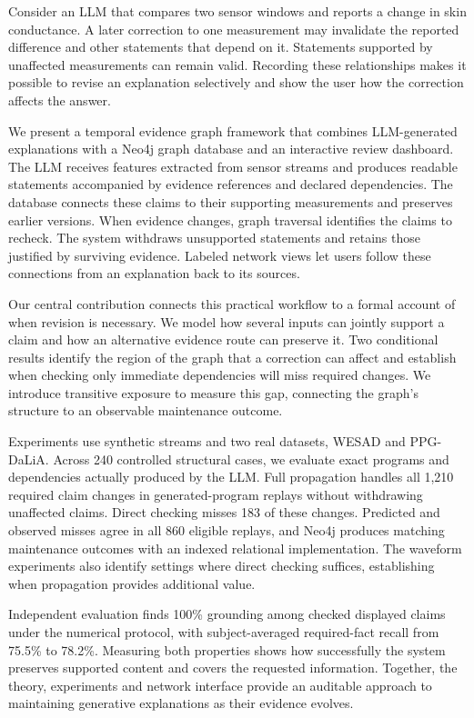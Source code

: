 \documentclass[runningheads]{llncs}
\newcommand{\SemCoreCases}{240}
\newcommand{\SemPredictionGroups}{860}
\newcommand{\SemSyntheticDisplayR}{78.2}
\newcommand{\SemPpgDisplayR}{75.5}
\begin{document}
Consider an LLM that compares two sensor windows and reports a change in skin
conductance. A later correction to one measurement may invalidate the reported
difference and other statements that depend on it. Statements supported by
unaffected measurements can remain valid. Recording these relationships makes
it possible to revise an explanation selectively and show the user how the
correction affects the answer.

We present a temporal evidence graph framework that combines LLM-generated
explanations with a Neo4j graph database and an interactive review dashboard.
The LLM receives features extracted from sensor streams and produces readable
statements accompanied by evidence references and declared dependencies.
The database connects these claims to their supporting measurements and
preserves earlier versions. When evidence changes, graph traversal identifies
the claims to recheck. The system withdraws unsupported statements and retains
those justified by surviving evidence. Labeled network views let users follow
these connections from an explanation back to its sources.

Our central contribution connects this practical workflow to a formal account
of when revision is necessary. We model how several inputs can jointly support
a claim and how an alternative evidence route can preserve it. Two conditional
results identify the region of the graph that a correction can affect and
establish when checking only immediate dependencies will miss required changes.
We introduce transitive exposure to measure this gap, connecting the graph's
structure to an observable maintenance outcome.

Experiments use synthetic streams and two real datasets, WESAD and PPG-DaLiA.
Across \SemCoreCases{} controlled structural cases, we evaluate exact programs
and dependencies actually produced by the LLM. Full propagation handles all
1,210 required claim changes in generated-program replays without withdrawing
unaffected claims. Direct checking misses 183 of these changes. Predicted and
observed misses agree in all \SemPredictionGroups{} eligible replays, and
Neo4j produces matching maintenance outcomes with an indexed relational
implementation. The waveform experiments also identify settings where direct
checking suffices, establishing when propagation provides additional value.

Independent evaluation finds 100\% grounding among checked displayed claims
under the numerical protocol, with subject-averaged required-fact recall from
\SemPpgDisplayR\% to \SemSyntheticDisplayR\%. Measuring both properties shows
how successfully the system preserves supported content and covers the requested
information. Together, the theory, experiments and network interface provide
an auditable approach to maintaining generative explanations as their evidence
evolves.
\end{document}
